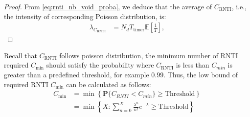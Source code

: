 \begin{proof}
	From \eqref{eq:rnti_nb_void_proba}, we deduce that the average of $C_{\text{RNTI}}$, i.e., the intensity of corresponding Poisson distribution, is:
	\begin{align}
		\lambda_{C_{\text{RNTI}}} &= N_{d} T_{\text{timer}} \mathbb{E} \left[ \frac{1}{T} \right],
	\end{align}
\end{proof}

Recall that $C_{\text{RNTI}}$  follows poisson distribution, the minimum number of RNTI required $C_{\text{min}}$ should satisfy the probability where $C_{\text{RNTI}}$ is less than $C_{min}$ is greater than a predefined threshold, for example $0.99$. Thus, the low bound of required RNTI $C_{\text{min}}$ can be calculated as follows:
\begin{align}	
\label{eq:low-bound-rach}
C_{\text{min}} &= \min \left\lbrace \mathbf{P} \{ C_{RNTI} < C_{min} \} \geq \text{Threshold} \right\rbrace \nonumber \\
&= \min \left\lbrace X: \sum_{n=0}^{X} \frac{\lambda ^ n }{ n! } e^{-\lambda} \geq \text{Threshold} \right\rbrace 
\end{align}






%
%




